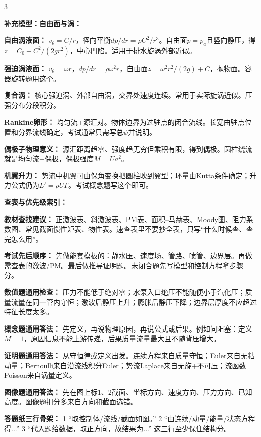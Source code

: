 \documentclass[a4paper]{article}
\newcommand{\sect}[1]{\par{\bfseries\color{Q}#1：}}
\begin{document}
\begin{multicols}{3}
{\sect{补充模型：自由面与涡}
\sect{自由涡液面}
$v_\theta=C/r$，径向平衡$dp/dr=\rho C^2/r^3$。自由面$p=p_a$且竖向静压，得$z=C_0-C^2/(2gr^2)$，中心凹陷。适用于排水旋涡外部近似。
\sect{强迫涡液面}
$v_\theta=\omega r$，$dp/dr=\rho\omega^2r$，自由面$z=\omega^2r^2/(2g)+C$，抛物面。容器旋转题用这个。
\sect{复合涡}
核心强迫涡、外部自由涡，交界处速度连续。常用于实际旋涡近似。压强分布分段积分。
\sect{Rankine卵形}
均匀流+源汇对。物体边界为过驻点的闭合流线。长宽由驻点位置和分界流线确定，考试通常只需写总$\psi$并说明。
\sect{偶极子物理意义}
源汇距离趋零、强度趋无穷但乘积有限，得到偶极。圆柱绕流就是均匀流+偶极，偶极强度$M=Ua^2$。
\sect{机翼升力}
势流中机翼可由保角变换把圆柱映到翼型；环量由Kutta条件确定；升力公式仍为$L'=\rho U\Gamma$。考试概念题写这个即可。

\sect{查表与优先级索引}
\sect{教材查找建议}
正激波表、斜激波表、PM表、面积--马赫表、Moody图、阻力系数图、常见截面惯性矩表、物性表。速查表里不要抄全表，只写“什么时候查、查完怎么用”。
\sect{考试先后顺序}
先做能套模板的：静水压、速度场、管路、喷管、边界层。再做需查表的激波/PM。最后做推导证明题。未闭合题先写模型和控制方程拿步骤分。
\sect{数值题通用检查}
压力不能低于绝对零；水泵入口绝压不能随便小于汽化压；质量流量在同一管内守恒；激波后静压上升；膨胀后静压下降；边界层厚度不应超过特征长度太多。
\sect{概念题通用答法}
先定义，再说物理原因，再说公式或后果。例如问阻塞：定义$M=1$，原因信息不能上游传递，后果质量流量最大且不随背压增大。
\sect{证明题通用答法}
从守恒律或定义出发。连续方程来自质量守恒；Euler来自无粘动量；Bernoulli来自沿流线积分Euler；势流Laplace来自无旋+不可压；流函数Poisson来自涡量定义。
\sect{图像题通用答法}
先在图上标1、2截面、坐标方向、速度方向、压力方向、已知高度。图像题扣分多来自方向和截面选错。
\sect{答题纸三行骨架}
1 “取控制体/流线/截面如图。” 2 “由连续/动量/能量/状态方程得...” 3 “代入题给数据，取正方向，故结果为...” 这三行至少保住结构分。

}
\end{multicols}
\end{document}
